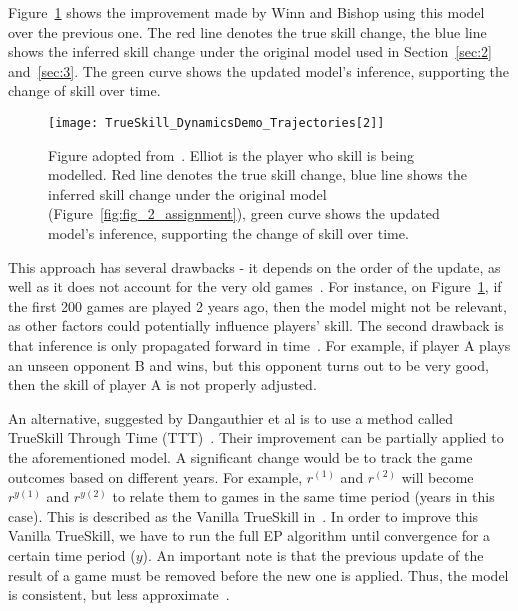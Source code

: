 \documentclass[a4paper,11pt]{article}
\theoremstyle{mytheor}
\begin{document}
Figure~\ref{fig:mbml_dynamic_skill_update} shows the improvement made by Winn and Bishop using this model over the previous one. The red line denotes the true skill change, the blue line shows the inferred skill change under the original model used in Section~\ref{sec:2} and~\ref{sec:3}. The green curve shows the updated model's inference, supporting the change of skill over time.

\begin{figure}[htpb!]
    \centering
    \texttt{[image: TrueSkill\_DynamicsDemo\_Trajectories[2]]}
    \caption{Figure adopted from~\cite{bishop2013model}. Elliot is the player who skill is being modelled. Red line denotes the true skill change, blue line shows the inferred skill change under the original model (Figure~\ref{fig:fig_2_assignment}), green curve shows the updated model's inference, supporting the change of skill over time.}
    \label{fig:mbml_dynamic_skill_update}
\end{figure}

This approach has several drawbacks - it depends on the order of the update, as well as it does not account for the very old games~\cite{dangauthier2007trueskill}. For instance, on Figure~\ref{fig:mbml_dynamic_skill_update}, if the first 200 games are played 2 years ago, then the model might not be relevant, as other factors could potentially influence players' skill. The second drawback is that inference is only propagated forward in time~\cite{dangauthier2007trueskill}. For example, if player A plays an unseen opponent B and wins, but this opponent turns out to be very good, then the skill of player A is not properly adjusted.

An alternative, suggested by Dangauthier et al is to use a method called TrueSkill Through Time (TTT)~\cite{dangauthier2007trueskill}. Their improvement can be partially applied to the aforementioned model. A significant change would be to track the game outcomes based on different years. For example, $r^{(1)}$ and $r^{(2)}$ will become $r^{y(1)}$ and $r^{y(2)}$ to relate them to games in the same time period (years in this case). This is described as the Vanilla TrueSkill in~\cite{dangauthier2007trueskill}. In order to improve this Vanilla TrueSkill, we have to run the full EP algorithm until convergence for a certain time period ($y$). An important note is that the previous update of the result of a game must be removed before the new one is applied. Thus, the model is consistent, but less approximate~\cite{dangauthier2007trueskill}.
\end{document}
